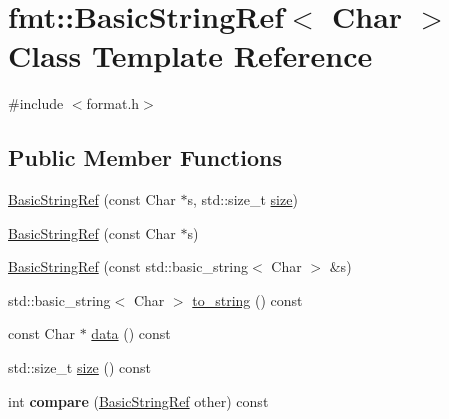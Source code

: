 \hypertarget{classfmt_1_1BasicStringRef}{}\section{fmt\+:\+:Basic\+String\+Ref$<$ Char $>$ Class Template Reference}
\label{classfmt_1_1BasicStringRef}


{\ttfamily \#include $<$format.\+h$>$}

\subsection*{Public Member Functions}
\begin{DoxyCompactItemize}
\item 
\hyperlink{classfmt_1_1BasicStringRef_adc7198e4dbd3eefff16081aae819181a}{Basic\+String\+Ref} (const Char $\ast$s, std\+::size\+\_\+t \hyperlink{classfmt_1_1BasicStringRef_ae38d9106dd5bec69488e5464aedc266a}{size})
\item 
\hyperlink{classfmt_1_1BasicStringRef_a5e3875071c0be193aa706d6c8e7bf29c}{Basic\+String\+Ref} (const Char $\ast$s)
\item 
\hyperlink{classfmt_1_1BasicStringRef_afd8ffd0c6d2ccac657f277a4faea3889}{Basic\+String\+Ref} (const std\+::basic\+\_\+string$<$ Char $>$ \&s)
\item 
std\+::basic\+\_\+string$<$ Char $>$ \hyperlink{classfmt_1_1BasicStringRef_a7340f48f53cf9188e9fea5e6e1556969}{to\+\_\+string} () const 
\item 
const Char $\ast$ \hyperlink{classfmt_1_1BasicStringRef_ae9c80502c527437215fe1c11dca8b475}{data} () const 
\item 
std\+::size\+\_\+t \hyperlink{classfmt_1_1BasicStringRef_ae38d9106dd5bec69488e5464aedc266a}{size} () const 
\item 
int {\bfseries compare} (\hyperlink{classfmt_1_1BasicStringRef}{Basic\+String\+Ref} other) const \hypertarget{classfmt_1_1BasicStringRef_a8e9a2f33780c6fe88bd80fb9da193ced}{}\label{classfmt_1_1BasicStringRef_a8e9a2f33780c6fe88bd80fb9da193ced}

\end{DoxyCompactItemize}
